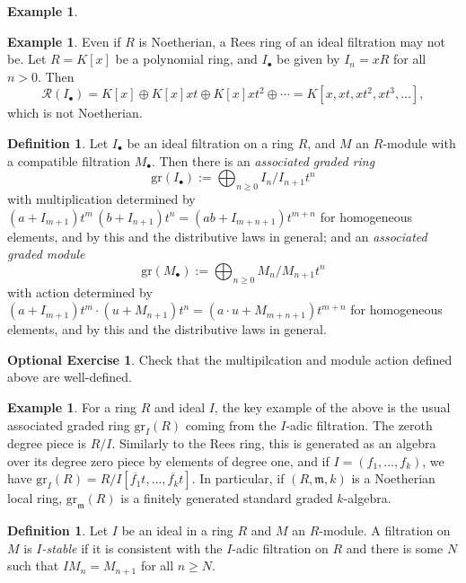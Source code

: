 \documentclass{amsart}[12pt]
\newcommand{\m}{{\mathfrak m}}
\numberwithin{equation}{section}
\theoremstyle{plain} %
\theoremstyle{definition}
\newtheorem{definition}[equation]{Definition}
\newtheorem{ex}[equation]{Example}
\newtheorem{example}[equation]{Example}
\newtheorem{exer}[equation]{Optional Exercise}
\theoremstyle{remark}
\newcommand{\gr}{\mathrm{gr}}
\begin{document}
\begin{ex}
\begin{ex} Even if $R$ is Noetherian, a Rees ring of an ideal filtration may not be. Let $R=K[x]$ be a polynomial ring, and $I_\bullet$ be given by $I_n=xR$ for all $n>0$. Then 
\[\mathcal{R}(I_\bullet) = K[x] \oplus K[x] x t \oplus K[x] x t^2  \oplus \cdots = K[x,xt,xt^2,xt^3,\dots],\]
 which is not Noetherian.
\end{ex}


\begin{definition} 
Let $I_{\bullet}$ be an ideal filtration on a ring $R$, and $M$ an $R$-module with a compatible filtration $M_{\bullet}$. Then there is an \emph{associated graded ring}\index{$\gr(I_{\bullet})$}
	\[ \gr(I_{\bullet}) := \bigoplus_{n\geq 0} I_n/I_{n+1} t^n \]
	with multiplication determined by $(a+I_{m+1}) t^m \, (b+I_{n+1}) t^n = (ab + I_{m+n+1}) t^{m+n}$ for homogeneous elements, and by this and the distributive laws in general;
	and an \emph{associated graded module}\index{$\gr(M_{\bullet})$}
	 	\[ \gr(M_{\bullet}) := \bigoplus_{n\geq 0} M_n/M_{n+1} t^n\]
	with action determined by $(a+I_{m+1}) t^m \cdot (u+M_{n+1}) t^n = (a\cdot u + M_{m+n+1}) t^{m+n}$ for homogeneous elements, and by this and the distributive laws in general.
\end{definition}

\begin{exer} Check that the multipilcation and module action defined above are well-defined.
\end{exer}

\begin{example} For a ring $R$ and ideal $I$, the key example of the above is the usual associated graded ring $\gr_I(R)$ \index{$\gr_I(R)$} coming from the $I$-adic filtration. The zeroth degree piece is $R/I$. Similarly to the Rees ring, this is generated as an algebra over its degree zero piece by elements of degree one, and if $I=(f_1,\dots,f_k)$, we have $\gr_I(R) = R/I [ \overline{f_1} t,\dots,\overline{f_k} t]$. In particular, if $(R,\m,k)$ is a Noetherian local ring, $\gr_{\m}(R)$ is a finitely generated standard graded $k$-algebra.\end{example}



\begin{definition}
	Let $I$ be an ideal in a ring $R$ and $M$ an $R$-module. A filtration on $M$ is \emph{$I$-stable} if it is consistent with the  $I$-adic filtration on $R$ and there is some $N$ such that $I M_n=M_{n+1}$ for all $n\geq N$.
\end{definition}


\end{ex}
\end{document}
